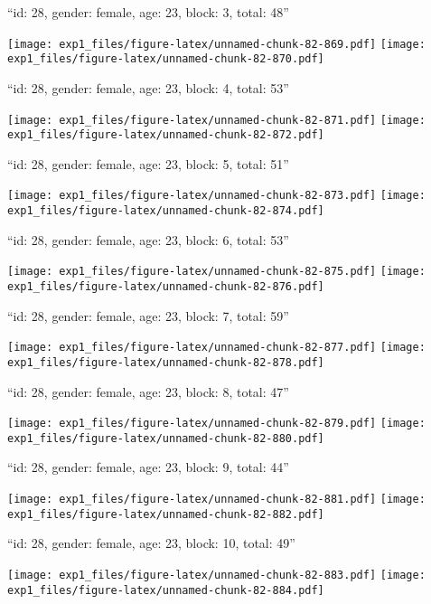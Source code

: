 \documentclass[11pt,,]{article}
\begin{document}
\newpage
[1] 

``id: 28, gender: female, age: 23, block: 3, total: 48''

\texttt{[image: exp1\_files/figure-latex/unnamed-chunk-82-869.pdf]}
\texttt{[image: exp1\_files/figure-latex/unnamed-chunk-82-870.pdf]}

\newpage
[1] 

``id: 28, gender: female, age: 23, block: 4, total: 53''

\texttt{[image: exp1\_files/figure-latex/unnamed-chunk-82-871.pdf]}
\texttt{[image: exp1\_files/figure-latex/unnamed-chunk-82-872.pdf]}

\newpage
[1] 

``id: 28, gender: female, age: 23, block: 5, total: 51''

\texttt{[image: exp1\_files/figure-latex/unnamed-chunk-82-873.pdf]}
\texttt{[image: exp1\_files/figure-latex/unnamed-chunk-82-874.pdf]}

\newpage
[1] 

``id: 28, gender: female, age: 23, block: 6, total: 53''

\texttt{[image: exp1\_files/figure-latex/unnamed-chunk-82-875.pdf]}
\texttt{[image: exp1\_files/figure-latex/unnamed-chunk-82-876.pdf]}

\newpage
[1] 

``id: 28, gender: female, age: 23, block: 7, total: 59''

\texttt{[image: exp1\_files/figure-latex/unnamed-chunk-82-877.pdf]}
\texttt{[image: exp1\_files/figure-latex/unnamed-chunk-82-878.pdf]}

\newpage
[1] 

``id: 28, gender: female, age: 23, block: 8, total: 47''

\texttt{[image: exp1\_files/figure-latex/unnamed-chunk-82-879.pdf]}
\texttt{[image: exp1\_files/figure-latex/unnamed-chunk-82-880.pdf]}

\newpage
[1] 

``id: 28, gender: female, age: 23, block: 9, total: 44''

\texttt{[image: exp1\_files/figure-latex/unnamed-chunk-82-881.pdf]}
\texttt{[image: exp1\_files/figure-latex/unnamed-chunk-82-882.pdf]}

\newpage
[1] 

``id: 28, gender: female, age: 23, block: 10, total: 49''

\texttt{[image: exp1\_files/figure-latex/unnamed-chunk-82-883.pdf]}
\texttt{[image: exp1\_files/figure-latex/unnamed-chunk-82-884.pdf]}
\end{document}
